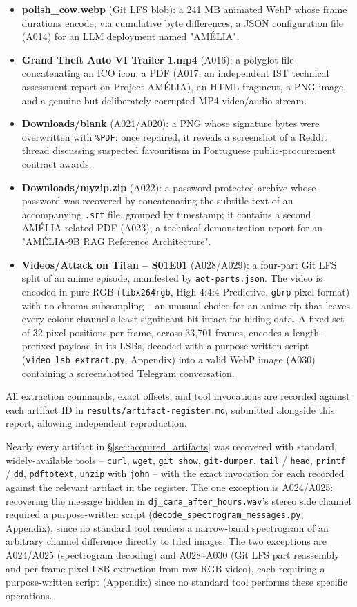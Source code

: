 \documentclass[11pt,a4paper,final,oneside]{article}
\begin{document}
\begin{itemize}
\item \textbf{polish\_cow.webp} (Git LFS blob): a 241 MB animated WebP whose frame durations
  encode, via cumulative byte differences, a JSON configuration file (A014) for an LLM
  deployment named "AMÉLIA".
\item \textbf{Grand Theft Auto VI Trailer 1.mp4} (A016): a polyglot file concatenating an ICO
  icon, a PDF (A017, an independent IST technical assessment report on Project AMÉLIA), an HTML
  fragment, a PNG image, and a genuine but deliberately corrupted MP4 video/audio stream.
\item \textbf{Downloads/blank} (A021/A020): a PNG whose signature bytes were overwritten with
  \texttt{\%PDF}; once repaired, it reveals a screenshot of a Reddit thread discussing suspected
  favouritism in Portuguese public-procurement contract awards.
\item \textbf{Downloads/myzip.zip} (A022): a password-protected archive whose password was
  recovered by concatenating the subtitle text of an accompanying \texttt{.srt} file, grouped by
  timestamp; it contains a second AMÉLIA-related PDF (A023), a technical demonstration report for
  an "AMÉLIA-9B RAG Reference Architecture".
\item \textbf{Videos/Attack on Titan -- S01E01} (A028/A029): a four-part Git LFS split of an
  anime episode, manifested by \texttt{aot-parts.json}. The video is encoded in pure RGB
  (\texttt{libx264rgb}, High 4:4:4 Predictive, \texttt{gbrp} pixel format) with no chroma
  subsampling -- an unusual choice for an anime rip that leaves every colour channel's
  least-significant bit intact for hiding data. A fixed set of 32 pixel positions per frame,
  across 33{,}701 frames, encodes a length-prefixed payload in its LSBs, decoded with a
  purpose-written script (\texttt{video\_lsb\_extract.py}, Appendix) into a valid WebP image
  (A030) containing a screenshotted Telegram conversation.
\end{itemize}

All extraction commands, exact offsets, and tool invocations are recorded against each artifact
ID in \texttt{results/artifact-register.md}, submitted alongside this report, allowing independent
reproduction.

Nearly every artifact in \S\ref{sec:acquired_artifacts} was recovered with standard,
widely-available tools -- \texttt{curl}, \texttt{wget}, \texttt{git show}, \texttt{git-dumper},
\texttt{tail} / \texttt{head}, \texttt{printf} / \texttt{dd}, \texttt{pdftotext}, \texttt{unzip}
with \texttt{john} -- with the exact invocation for each recorded against the relevant artifact
in the register. The one exception is A024/A025: recovering the message hidden in
\texttt{dj\_cara\_after\_hours.wav}'s stereo side channel required a purpose-written script
(\texttt{decode\_spectrogram\_messages.py}, Appendix), since no standard tool renders a
narrow-band spectrogram of an arbitrary channel difference directly to tiled images.
The two exceptions are A024/A025 (spectrogram decoding) and A028--A030 (Git LFS part
reassembly and per-frame pixel-LSB extraction from raw RGB video), each requiring a
purpose-written script (Appendix) since no standard tool performs these specific operations.
\end{document}
